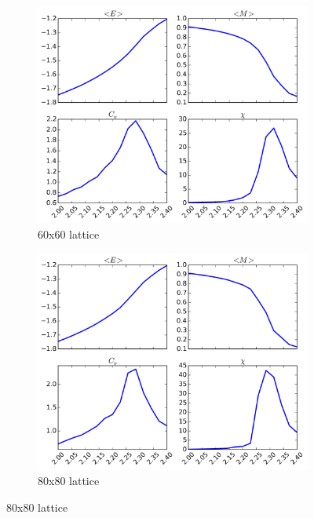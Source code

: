 \documentclass[11pt,a4paper,final]{article}
\numberwithin{equation}{section}
\begin{document}
\begin{figure}
\begin{subfigure}{0.49\textwidth}
\includegraphics[width=\textwidth]{pics/e60.png}
\caption{60x60 lattice}
\label{fig:e60}
\end{subfigure}
%
\begin{subfigure}{0.49\textwidth}
\centering
\includegraphics[width=\textwidth]{pics/e80.png}
\caption{80x80 lattice}
\label{fig:e80}
\end{subfigure}


\end{figure}
\end{document}
